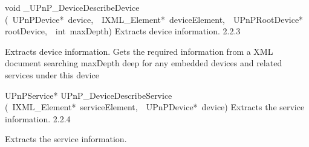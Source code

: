 \documentclass{article}
\begin{document}
\begin{cxxentry}
\begin{cxxentry}
\begin{cxxfunction}
\begin{cxxdoc}
\end{cxxdoc}
\end{cxxfunction}
\begin{cxxfunction}
{void}
        {\_UPnP\_DeviceDescribeDevice}
        {(\ UPnPDevice*\ device,\ \ IXML\_Element*\ deviceElement,\ \ UPnPRootDevice*\ rootDevice,\ \ int\ maxDepth)}
        {Extracts device information.}
        {2.2.3}
\begin{cxxdoc}
Extracts device information.  Gets the required information from a XML
document searching maxDepth deep for any embedded devices and related
services under this device


\end{cxxdoc}
\end{cxxfunction}
\begin{cxxfunction}
{UPnPService*}
        {UPnP\_DeviceDescribeService}
        {(\ IXML\_Element*\ serviceElement,\ \ UPnPDevice*\ device)}
        {Extracts the service information.}
        {2.2.4}
\begin{cxxdoc}
Extracts the service information.



\end{cxxdoc}
\end{cxxfunction}
\end{cxxentry}
\end{cxxentry}
\end{document}
